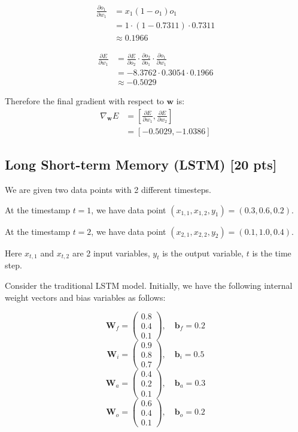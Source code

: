 \begin{align}
    \frac{\partial o_1}{\partial w_1} &= x_1 (1 - o_1) o_1 \nonumber \\
    &= 1 \cdot (1 - 0.7311) \cdot 0.7311 \nonumber \\
    &\approx 0.1966
\end{align}

\begin{align}
    \frac{\partial E}{\partial w_1} &= \frac{\partial E}{\partial o_2} \cdot \frac{\partial o_2}{\partial o_1} \cdot \frac{\partial o_1}{\partial w_1} \nonumber \\
    &= -8.3762 \cdot 0.3054 \cdot 0.1966 \nonumber \\
    &\approx -0.5029
\end{align}

Therefore the final gradient with respect to $\mathbf{w}$ is:
\begin{align}
    \nabla_{\mathbf{w}} E &= \left[ \frac{\partial E}{\partial w_1}, \frac{\partial E}{\partial w_2} \right] \nonumber \\
    &= \left[ -0.5029, -1.0386 \right]
\end{align}


\subsection{Long Short-term Memory (LSTM) [20 pts]}

We are given two data points with 2 different timesteps. 

At the timestamp \( t = 1 \), we have data point \( (x_{1,1}, x_{1,2}, y_1) = (0.3, 0.6, 0.2) \). 

At the timestamp \( t = 2 \), we have data point \( (x_{2,1}, x_{2,2}, y_2) = (0.1, 1.0, 0.4) \). 

Here \( x_{t,1} \) and \( x_{t,2} \) are 2 input variables, \( y_t \) is the output variable, \( t \) is the time step.

Consider the traditional LSTM model. Initially, we have the following internal weight vectors and bias variables as follows:

\[
\mathbf{W}_f = \begin{pmatrix} 0.8 \\ 0.4 \\ 0.1 \end{pmatrix}, \quad \mathbf{b}_f = 0.2
\]
\[
\mathbf{W}_i = \begin{pmatrix} 0.9 \\ 0.8 \\ 0.7 \end{pmatrix}, \quad \mathbf{b}_i = 0.5
\]
\[
\mathbf{W}_a = \begin{pmatrix} 0.4 \\ 0.2 \\ 0.1 \end{pmatrix}, \quad \mathbf{b}_a = 0.3
\]
\[
\mathbf{W}_o = \begin{pmatrix} 0.6 \\ 0.4 \\ 0.1 \end{pmatrix}, \quad \mathbf{b}_o = 0.2
\]

